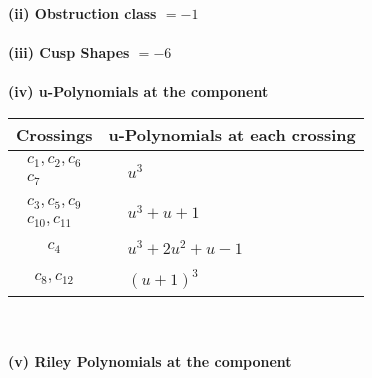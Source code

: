 \documentclass[1p]{elsarticle_modified}
\theoremstyle{definition}
\begin{document}
\flushleft \textbf{(ii) Obstruction class $= -1$}\\~\\
\flushleft \textbf{(iii) Cusp Shapes $= -6$}\\~\\
\newpage\renewcommand{\arraystretch}{1}
\flushleft \textbf{(iv) u-Polynomials at the component}\newline \\
\begin{tabular}{m{50pt}|m{274pt}}
Crossings & \hspace{64pt}u-Polynomials at each crossing \\
\hline $$\begin{aligned}c_{1},c_{2},c_{6}\\c_{7}\end{aligned}$$&$\begin{aligned}
&u^3
\end{aligned}$\\
\hline $$\begin{aligned}c_{3},c_{5},c_{9}\\c_{10},c_{11}\end{aligned}$$&$\begin{aligned}
&u^3+u+1
\end{aligned}$\\
\hline $$\begin{aligned}c_{4}\end{aligned}$$&$\begin{aligned}
&u^3+2 u^2+u-1
\end{aligned}$\\
\hline $$\begin{aligned}c_{8},c_{12}\end{aligned}$$&$\begin{aligned}
&(u+1)^3
\end{aligned}$\\
\hline
\end{tabular}\\~\\
\newpage\renewcommand{\arraystretch}{1}
\flushleft \textbf{(v) Riley Polynomials at the component}\newline \\
\end{document}
